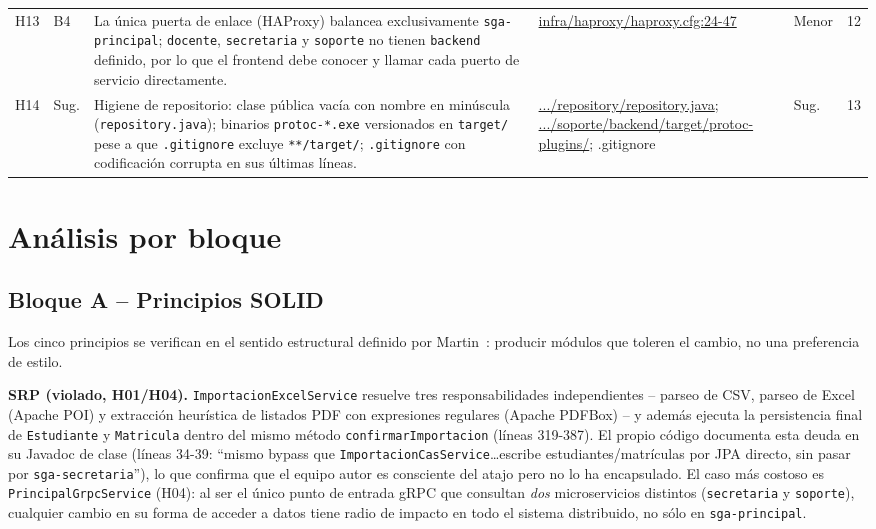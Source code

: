 \documentclass[11pt,a4paper]{article}
\begin{document}
{\begin{xltabular}{\textwidth}{@{}p{0.55cm}p{0.95cm}X p{3.5cm}p{1.05cm}p{0.6cm}@{}}
        H13 & B4 & La \'unica puerta de enlace (HAProxy) balancea exclusivamente \texttt{sga-principal}; \texttt{docente}, \texttt{secretaria} y \texttt{soporte} no tienen \texttt{backend} definido, por lo que el frontend debe conocer y llamar cada puerto de servicio directamente. & {\raggedright\scriptsize\url{infra/haproxy/haproxy.cfg:24-47}\par} & Menor & 12 \\
        H14 & Sug. & Higiene de repositorio: clase p\'ublica vac\'ia con nombre en min\'uscula (\texttt{repository.java}); binarios \texttt{protoc-*.exe} versionados en \texttt{target/} pese a que \texttt{.gitignore} excluye \texttt{**/target/}; \texttt{.gitignore} con codificaci\'on corrupta en sus \'ultimas l\'ineas. & {\raggedright\scriptsize\url{.../repository/repository.java};\newline \url{.../soporte/backend/target/protoc-plugins/}; .gitignore\par} & Sug. & 13 \\
        \bottomrule
    \end{xltabular}
    }
    \section{An\'alisis por bloque}
    \label{sec:analisis}

    \subsection{Bloque A -- Principios SOLID}

    Los cinco principios se verifican en el sentido estructural definido por Martin~\cite{martin2017}: producir m\'odulos que toleren el cambio, no una preferencia de estilo.

    \textbf{SRP (violado, H01/H04).} \texttt{ImportacionExcelService} resuelve tres responsabilidades independientes -- parseo de CSV, parseo de Excel (Apache POI) y extracci\'on heur\'istica de listados PDF con expresiones regulares (Apache PDFBox) -- y adem\'as ejecuta la persistencia final de \texttt{Estudiante} y \texttt{Matricula} dentro del mismo m\'etodo \texttt{confirmarImportacion} (l\'ineas 319-387). El propio c\'odigo documenta esta deuda en su Javadoc de clase (l\'ineas 34-39: ``mismo bypass que \texttt{ImportacionCasService}\ldots escribe estudiantes/matr\'iculas por JPA directo, sin pasar por \texttt{sga-secretaria}''), lo que confirma que el equipo autor es consciente del atajo pero no lo ha encapsulado. El caso m\'as costoso es \texttt{PrincipalGrpcService} (H04): al ser el \'unico punto de entrada gRPC que consultan \emph{dos} microservicios distintos (\texttt{secretaria} y \texttt{soporte}), cualquier cambio en su forma de acceder a datos tiene radio de impacto en todo el sistema distribuido, no s\'olo en \texttt{sga-principal}.
\end{document}
